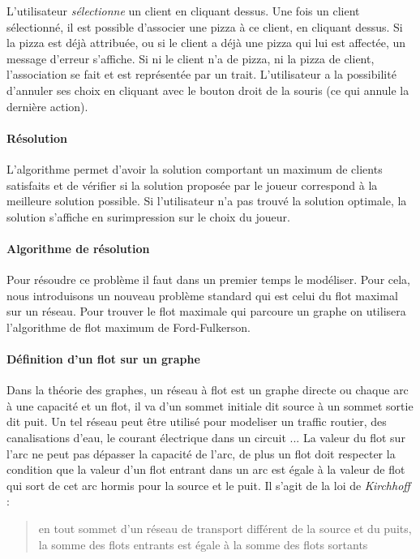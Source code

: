 		L'utilisateur \emph{sélectionne} un client en cliquant dessus.
		    Une fois un client sélectionné, il est possible
		    d'associer une pizza à ce client, en cliquant dessus.
		    Si la pizza est déjà attribuée, ou si le client a déjà
		    une pizza qui lui est affectée, un message d'erreur s'affiche.
		    Si ni le client n'a de pizza, ni la pizza de client, l'association
		    se fait et est représentée par un trait.
		L'utilisateur a la possibilité d'annuler ses choix en cliquant avec le bouton
		    droit de la souris (ce qui annule la dernière action).
		\paragraph{Résolution}
			L'algorithme permet d'avoir la solution comportant un maximum de clients
			 satisfaits et de vérifier si la solution proposée par le joueur correspond
			 à la meilleure solution possible.
 			Si l'utilisateur n'a pas trouvé la solution optimale, la solution s'affiche
			 en surimpression sur le choix du joueur.
            

		\paragraph{Algorithme de résolution}
			Pour résoudre ce problème il faut dans un premier temps le modéliser.
            Pour cela, nous introduisons un nouveau problème standard qui est celui du flot maximal sur un
            réseau. Pour trouver le flot maximale qui parcoure un graphe on utilisera l'algorithme de flot
             maximum de Ford-Fulkerson.

        \paragraph{Définition d’un flot sur un graphe}

	    Dans la théorie des graphes, un réseau à flot est un graphe directe ou chaque arc à une capacité et un flot, il va d'un sommet initiale dit source à un sommet sortie dit puit. 
	    Un tel réseau peut être utilisé pour modeliser un traffic routier, des canalisations d'eau, le courant électrique dans un circuit ...
	    La valeur du flot sur l'arc ne peut pas dépasser la capacité de l'arc, de plus un flot doit respecter la condition que la valeur d'un flot entrant dans un arc 
	    est égale à la valeur de flot qui sort de cet arc hormis pour la source et le puit.
\newline
	    Il s'agit de la loi de \emph{Kirchhoff} : 
\begin{quote}

en tout sommet d’un réseau de transport
différent de la source et du puits, la somme des flots
entrants est égale à la somme des flots sortants 
 
\end{quote}

